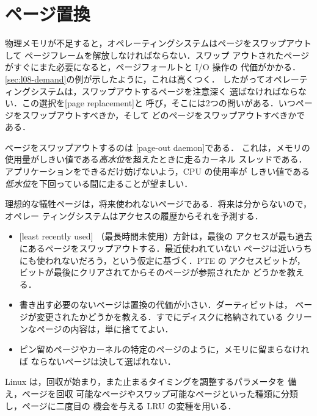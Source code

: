 \documentclass[../main.tex]{subfiles}
\begin{document}
\section{ページ置換}
\label{sec:l08-replacement}

物理メモリが不足すると，オペレーティングシステムはページをスワップアウトして
ページフレームを解放しなければならない．スワップ
アウトされたページがすぐにまた必要になると，ページフォールトと I/O 操作の
代価がかかる．\cref{sec:l08-demand}の例が示したように，これは高くつく．
したがってオペレーティングシステムは，スワップアウトするページを注意深く
選ばなければならない．この選択を[page replacement]と
呼び，そこには2つの問いがある．いつページをスワップアウトすべきか，そして
どのページをスワップアウトすべきかである．

ページをスワップアウトするのは
[page-out daemon]である．
これは，メモリの使用量がしきい値である\emph{高水位}を超えたときに走るカーネル
スレッドである．アプリケーションをできるだけ妨げないよう，CPU の使用率が
しきい値である\emph{低水位}を下回っている間に走ることが望ましい．

理想的な犠牲ページは，将来使われないページである．将来は分からないので，オペレー
ティングシステムはアクセスの履歴からそれを予測する．
\begin{itemize}
  \item {}[least recently used]%
    （最長時間未使用）方針は，最後の
    アクセスが最も過去にあるページをスワップアウトする．最近使われていない
    ページは近いうちにも使われないだろう，という仮定に基づく．PTE の
    アクセスビットが，ビットが最後にクリアされてからそのページが参照されたか
    どうかを教える．
  \item 書き出す必要のないページは置換の代価が小さい．ダーティビットは，
    ページが変更されたかどうかを教える．すでにディスクに格納されている
    クリーンなページの内容は，単に捨ててよい．
  \item ピン留めページやカーネルの特定のページのように，メモリに留まらなければ
    ならないページは決して選ばれない．
\end{itemize}
Linux は，回収が始まり，また止まるタイミングを調整するパラメータを
備え，ページを回収
可能なページやスワップ可能なページといった種類に分類し，ページに二度目の
機会を与える LRU の変種を用いる．
\end{document}
